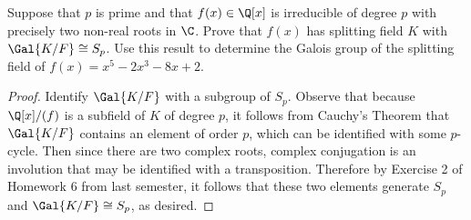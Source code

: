 \documentclass[10pt]{amsart}
\begin{document}
\setcounter{thm}{3}
\begin{thm}
  Suppose that $p$ is prime and that $f(x) \in \Q[x]$ is irreducible of degree $p$ with precisely two non-real roots in $\C$.
  Prove that $f(x)$ has splitting field $K$ with $\Gal{K/F} \cong S_p$.
  Use this result to determine the Galois group of the splitting field of $f(x) = x^5 - 2x^3 - 8x + 2$.
  
  \begin{proof}
    Identify $\Gal{K/F}$ with a subgroup of $S_p$.
    Observe that because $\Q[x]/(f)$ is a subfield of $K$ of degree $p$, it follows from Cauchy's Theorem that $\Gal{K/F}$ contains an element of order $p$, which can be identified with some $p$-cycle.
    Then since there are two complex roots, complex conjugation is an involution that may be identified with a transposition.
    Therefore by Exercise 2 of Homework 6 from last semester, it follows that these two elements generate $S_p$ and $\Gal{K/F} \cong S_p$, as desired.
  \end{proof}
\end{thm}
\end{document}
